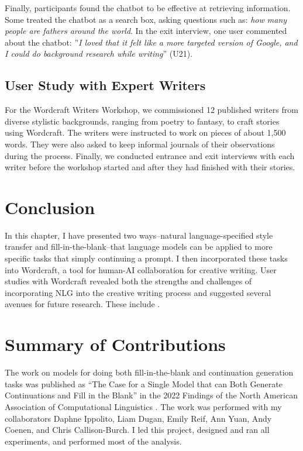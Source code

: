 Finally, participants found the chatbot to be effective at retrieving information. Some treated the chatbot as a search box, asking questions such as: \textit{how many people are fathers around the world}. In the exit interview, one user commented about the chatbot: ''\textit{I loved that it felt like a more targeted version of Google, and I could do background research while writing}'' (U21).

\subsection{User Study with Expert Writers}



For the Wordcraft Writers Workshop, we commissioned 12 published writers from diverse stylistic backgrounds, ranging from poetry to fantasy, to craft stories using Wordcraft. The writers were instructed to work on pieces of about 1,500 words. They were also asked to keep informal journals of their observations during the process. Finally, we conducted entrance and exit interviews with each writer before the workshop started and after they had finished with their stories.


\section{Conclusion}
In this chapter, I have presented two ways--natural language-specified style transfer and fill-in-the-blank--that language models can be applied to more specific tasks that simply continuing a prompt.
I then incorporated these tasks into Wordcraft, a tool for human-AI collaboration for creative writing.
User studies with Wordcraft revealed both the strengths and challenges of incorporating NLG into the creative writing process and suggested several avenues for future research.
These include \TODO{}.

\section{Summary of Contributions}
The work on models for doing both fill-in-the-blank and continuation generation tasks was published as ``The Case for a Single Model that can Both Generate Continuations and Fill in the Blank'' in the 2022 Findings of the North American Association of Computational Linguistics \citep{fitb_fite}.
The work was performed with my collaborators Daphne Ippolito, Liam Dugan, Emily Reif, Ann Yuan, Andy Coenen, and Chris Callison-Burch.
I led this project, designed and ran all experiments, and performed most of the analysis.

